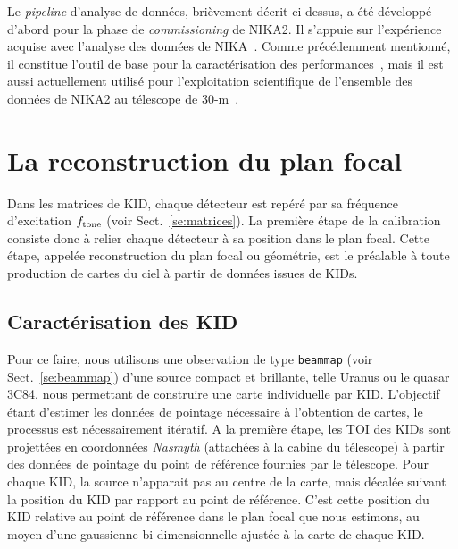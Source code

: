 Le \emph{pipeline} d'analyse de données, brièvement décrit
ci-dessus, a été développé d'abord pour la phase de
\emph{commissioning} de NIKA2. Il s'appuie sur l'expérience acquise
avec l'analyse des données de NIKA~\citep{Catalano2014,
  Adam2014}. Comme précédemment mentionné, il constitue l'outil de
base pour la caractérisation des
performances~\citep{Adam2018, Perotto2019, Ponthieu2020}, mais il est
aussi actuellement utilisé pour l'exploitation scientifique de
l'ensemble des données de NIKA2 au télescope de
30-m~\citep{Ruppin2018, Ruppin2019c}.  


%
%
\section{La reconstruction du plan focal}
\label{se:fov_geometry}

Dans les matrices de KID, chaque détecteur est repéré par sa fréquence
d'excitation $f_{\rm{tone}}$ (voir Sect.~\ref{se:matrices}). La
première étape de la calibration consiste donc à relier chaque
détecteur à sa position dans le plan focal. Cette
étape, appelée reconstruction du plan focal ou géométrie, est le
préalable à toute production de cartes du ciel à partir de données
issues de KIDs.

\subsection{Caractérisation des KID}
\label{se:KID_pointing}

Pour ce faire, nous utilisons une observation de type {\tt beammap}
(voir Sect.~\ref{se:beammap}) d'une source compact et brillante, telle
Uranus ou le quasar 3C84, nous permettant de construire une carte
individuelle par KID. L'objectif étant d'estimer les données de
pointage nécessaire à l'obtention de cartes, le processus est
nécessairement itératif. A la première étape, les TOI des KIDs sont
projettées en coordonnées \emph{Nasmyth} (attachées à la cabine du
télescope) à partir des données de pointage du point de référence
fournies par le télescope. Pour chaque KID, la source n'apparait pas
au centre de la carte, mais décalée suivant la position du KID par
rapport au point de référence. C'est cette position du KID relative au
point de référence dans le plan focal que nous estimons, au moyen d'une
gaussienne bi-dimensionnelle ajustée à la carte de chaque KID. 

